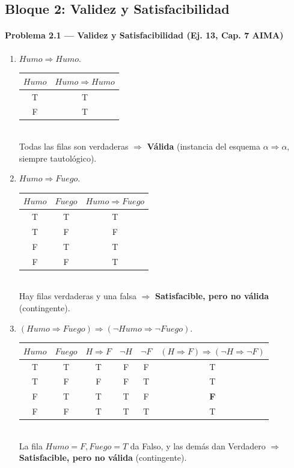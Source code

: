 \subsection{Bloque 2: Validez y Satisfacibilidad}

\paragraph{Problema 2.1 --- Validez y Satisfacibilidad (Ej. 13, Cap. 7 AIMA)}

\begin{enumerate}
    \item $Humo \Rightarrow Humo$.\\
    \begin{tabular}{cc}
        \toprule
        $Humo$ & $Humo\Rightarrow Humo$ \\
        \midrule
        T & T \\
        F & T \\
        \bottomrule
    \end{tabular}\\
    Todas las filas son verdaderas $\Rightarrow$ \textbf{Válida} (instancia del esquema $\alpha
    \Rightarrow \alpha$, siempre tautológico).

    \item $Humo \Rightarrow Fuego$.\\
    \begin{tabular}{ccc}
        \toprule
        $Humo$ & $Fuego$ & $Humo\Rightarrow Fuego$ \\
        \midrule
        T & T & T \\
        T & F & F \\
        F & T & T \\
        F & F & T \\
        \bottomrule
    \end{tabular}\\
    Hay filas verdaderas y una falsa $\Rightarrow$ \textbf{Satisfacible, pero no válida} (contingente).

    \item $(Humo \Rightarrow Fuego) \Rightarrow (\neg Humo \Rightarrow \neg Fuego)$.\\
    \begin{tabular}{cccccc}
        \toprule
        $Humo$ & $Fuego$ & $H\Rightarrow F$ & $\neg H$ & $\neg F$ & $(H\Rightarrow F)\Rightarrow(\neg H\Rightarrow\neg F)$ \\
        \midrule
        T & T & T & F & F & T \\
        T & F & F & F & T & T \\
        F & T & T & T & F & \textbf{F} \\
        F & F & T & T & T & T \\
        \bottomrule
    \end{tabular}\\
    La fila $Humo=F, Fuego=T$ da Falso, y las demás dan Verdadero $\Rightarrow$
    \textbf{Satisfacible, pero no válida} (contingente).


\end{enumerate}
